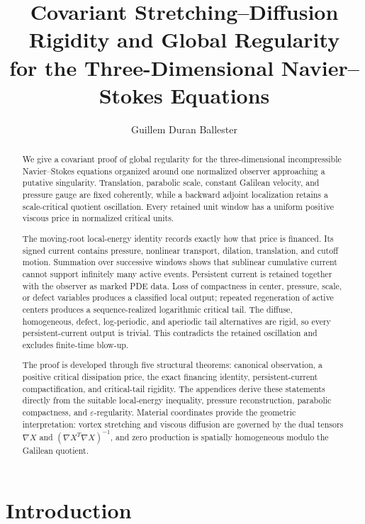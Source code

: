 \documentclass[11pt]{amsart}
\title[Covariant Stretching--Diffusion Rigidity]
{Covariant Stretching--Diffusion Rigidity and Global Regularity\\
for the Three-Dimensional Navier--Stokes Equations}
\author{Guillem Duran Ballester}
\date{}
\numberwithin{equation}{section}
\theoremstyle{plain}
\theoremstyle{definition}
\theoremstyle{remark}
\begin{document}
\begin{abstract}
We give a covariant proof of global regularity for the three-dimensional
incompressible Navier--Stokes equations organized around one normalized
observer approaching a putative singularity.  Translation, parabolic scale,
constant Galilean velocity, and pressure gauge are fixed coherently, while a
backward adjoint localization retains a scale-critical quotient oscillation.
Every retained unit window has a uniform positive viscous price in normalized
critical units.

The moving-root local-energy identity records exactly how that price is
financed.  Its signed current contains pressure, nonlinear transport,
dilation, translation, and cutoff motion.  Summation over successive windows
shows that sublinear cumulative current cannot support infinitely many active
events.  Persistent current is retained together with the observer as marked
PDE data.  Loss of compactness in center, pressure, scale, or defect variables
produces a classified local output; repeated regeneration of active centers
produces a sequence-realized logarithmic critical tail.  The diffuse,
homogeneous, defect, log-periodic, and aperiodic tail alternatives are rigid,
so every persistent-current output is trivial.  This contradicts the retained
oscillation and excludes finite-time blow-up.

The proof is developed through five structural theorems: canonical
observation, a positive critical dissipation price, the exact financing
identity, persistent-current compactification, and critical-tail rigidity.
The appendices derive these statements directly from the suitable local-energy
inequality, pressure reconstruction, parabolic compactness, and
\(\varepsilon\)-regularity.  Material coordinates provide the geometric
interpretation: vortex stretching and viscous diffusion are governed by the
dual tensors \(\nabla X\) and
\((\nabla X^{T}\nabla X)^{-1}\), and zero production is spatially homogeneous
modulo the Galilean quotient.
\end{abstract}

\maketitle
\enlargethispage{2pt}
\tableofcontents

\section{Introduction}
\end{document}
